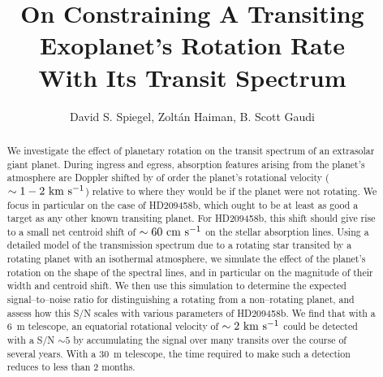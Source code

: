 \documentclass[12pt,preprint]{aastex}
\begin{document}

\title{%
On Constraining A Transiting Exoplanet's Rotation Rate\\
With Its Transit Spectrum}

\author{David S. Spiegel, Zolt\'an Haiman,
B. Scott Gaudi}



\vspace{0.5\baselineskip}





\begin{abstract}
We investigate the effect of planetary rotation on the transit
spectrum of an extrasolar giant planet.
During ingress and egress, absorption features arising from the planet's
atmosphere are Doppler shifted by of order the planet's rotational
velocity ($\sim 1-2 {\rm ~km~s^{-1}}$) relative to where they would be
if the planet were not rotating.  We focus in particular on the case of
HD209458b, which ought to be at least as good a target as any other known
transiting planet.  For HD209458b, this shift should give rise to a small
net centroid shift of $\sim 60 {\rm ~cm~s^{-1}}$ on the stellar absorption
lines.  Using a detailed model of the transmission spectrum due to a
rotating star transited by a rotating planet with an isothermal atmosphere,
we simulate the effect of the planet's rotation on the shape
of the spectral lines, and in particular on the magnitude of their width
and centroid shift.  We then use this simulation to determine the
expected signal--to--noise ratio for distinguishing a rotating from a
non--rotating planet, and assess how this S/N scales with
various parameters of HD209458b.  We find that with a 6~m telescope,
an equatorial rotational velocity of $\sim 2 {\rm ~km~s^{-1}}$ could be
detected with a S/N $\sim 5$ by accumulating the signal over many transits
over the course of several years.  With a 30~m telescope, the time required
to make such a detection reduces to less than 2 months.
\end{abstract}
\end{document}
